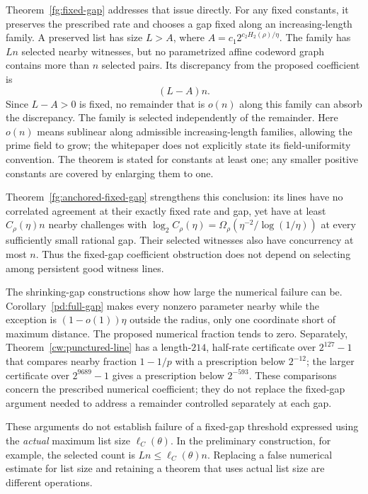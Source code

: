 \documentclass[11pt,letterpaper]{article}
\theoremstyle{definition}
\theoremstyle{remark}
\begin{document}
Theorem~\ref{fg:fixed-gap} addresses that issue directly. For any fixed
constants, it preserves the prescribed rate and chooses a gap fixed along an
increasing-length family. A preserved list has size
$L>A$, where $A=c_1 2^{c_2H_2(\rho)/\eta}$. The family has $Ln$
selected nearby witnesses, but no parametrized affine codeword graph
contains more than $n$ selected pairs. Its discrepancy from the
proposed coefficient is
\[
 (L-A)n.
\]
Since $L-A>0$ is fixed, no remainder that is $o(n)$ along this family
can absorb the discrepancy. The family is selected independently of
the remainder. Here $o(n)$ means sublinear along admissible
increasing-length families, allowing the prime field to grow; the
whitepaper does not explicitly state its field-uniformity convention.
The theorem is stated for constants at least one;
any smaller positive constants are covered by enlarging them to one.

Theorem~\ref{fg:anchored-fixed-gap} strengthens this conclusion:
its lines have no correlated agreement at their exactly fixed rate
and gap, yet have at least $C_\rho(\eta)n$ nearby challenges with
$\log_2 C_\rho(\eta)=\Omega_\rho(\eta^{-2}/\log(1/\eta))$
at every sufficiently small rational gap. Their selected witnesses also have
concurrency at most $n$. Thus the fixed-gap coefficient obstruction
does not depend on selecting among persistent good witness lines.

The shrinking-gap constructions show how large the numerical failure
can be. Corollary~\ref{pd:full-gap} makes every nonzero parameter
nearby while the exception is $(1-o(1))\eta$ outside the radius, only
one coordinate short of maximum distance. The proposed numerical
fraction tends to zero. Separately, Theorem~\ref{cw:punctured-line} has
a length-$214$, half-rate certificate over $2^{127}-1$ that compares
nearby fraction $1-1/p$ with a prescription below $2^{-12}$; the
larger certificate over $2^{9689}-1$ gives a prescription below $2^{-593}$. These comparisons concern the prescribed numerical
coefficient; they do not replace the fixed-gap argument needed to
address a remainder controlled separately at each gap.

These arguments do not establish failure of a fixed-gap threshold
expressed using the \emph{actual} maximum list size $\ell_C(\theta)$.
In the preliminary construction, for example, the selected count is
$Ln\le\ell_C(\theta)n$. Replacing a false numerical estimate for
list size and retaining a theorem that uses actual list size are
different operations.
\end{document}
